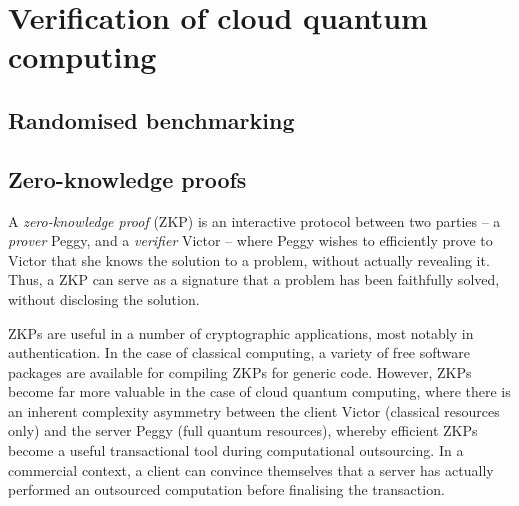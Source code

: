 %
%

\section{Verification of cloud quantum computing} \label{sec:verification}

\subsection{Randomised benchmarking}\label{sec:rand_bench}


\subsection{Zero-knowledge proofs}\label{sec:ZKP}




A \textit{zero-knowledge proof} (ZKP) is an interactive protocol between two parties -- a \textit{prover} Peggy, and a \textit{verifier} Victor -- where Peggy wishes to efficiently prove to Victor that she knows the solution to a problem, without actually revealing it. Thus, a ZKP can serve as a signature that a problem has been faithfully solved, without disclosing the solution.

ZKPs are useful in a number of cryptographic applications, most notably in authentication. In the case of classical computing, a variety of free software packages are available for compiling ZKPs for generic code. However, ZKPs become far more valuable in the case of cloud quantum computing, where there is an inherent complexity asymmetry between the client Victor (classical resources only) and the server Peggy (full quantum resources), whereby efficient ZKPs become a useful transactional tool during computational outsourcing. In a commercial context, a client can convince themselves that a server has actually performed an outsourced computation before finalising the transaction.

